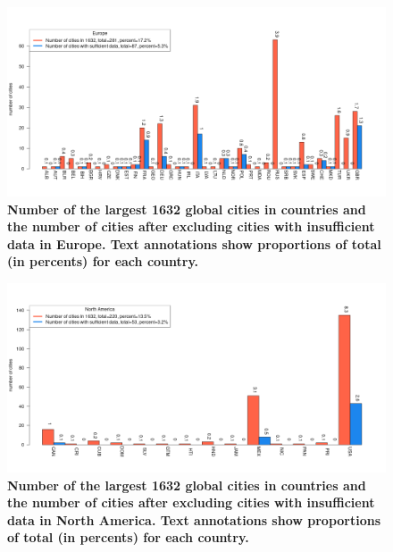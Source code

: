 \documentclass[preprint,10pt]{elsarticle} %
\begin{document}
\begin{figure}
\centering
\includegraphics[trim={ 0 35 25 50 },clip,scale=0.45]{Images2/Europe_cities_Rev2.png}
\caption{\bf Number of the largest 1632 global cities in countries and the number of cities after excluding cities with insufficient data in Europe. Text annotations show proportions of total (in percents) for each country.}
 \label{fig:europe}
\end{figure}

\begin{figure}
\centering
\includegraphics[trim={ 0 35 25 50 },clip,scale=0.45]{Images2/North America_cities_Rev2.png}
\caption{\bf Number of the largest 1632 global cities in countries and the number of cities after excluding cities with insufficient data in North America. Text annotations show proportions of total (in percents) for each country.}
 \label{fig:northamerica}
\end{figure}
\end{document}
